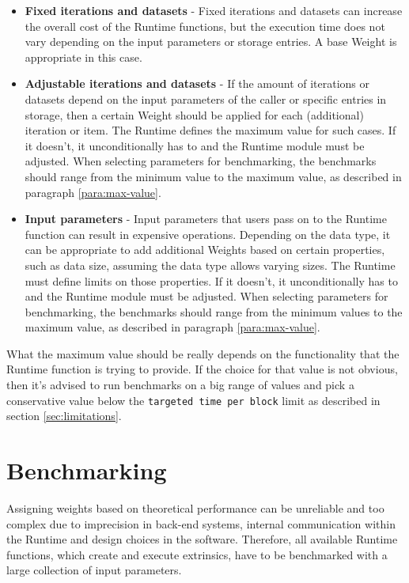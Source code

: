 \documentclass[11pt,a4paper]{article}
\begin{document}
\begin{itemize}
  \item \textbf{Fixed iterations and datasets} -
  Fixed iterations and datasets can increase the overall cost of the Runtime functions,
  but the execution time
  does not vary depending on the input parameters or storage entries.
  A base Weight is appropriate in this case.
  \item \textbf{Adjustable iterations and datasets} -
  If the amount of iterations or datasets depend on the input parameters of the caller or
  specific entries in storage,
  then a certain Weight should be applied for each (additional) iteration or item.
  The Runtime defines the maximum value for such cases. If it doesn't, it unconditionally has to
  and the Runtime module must be adjusted.
  \newline\newline
  When selecting parameters
  for benchmarking, the benchmarks should range from the minimum value to the maximum value, as described
  in paragraph \ref{para:max-value}.
  \item \textbf{Input parameters} -
  Input parameters that users pass on to the Runtime function can result in expensive operations.
  Depending on the data type, it can be appropriate to add additional Weights based on certain properties,
  such as data size, assuming the data type allows varying sizes.
  The Runtime must define limits on those properties. If it doesn't, it unconditionally
  has to and the Runtime module must be adjusted.
  \newline\newline
  When selecting parameters for benchmarking, the benchmarks should range from the minimum values to the
  maximum value, as described in paragraph \ref{para:max-value}.
\end{itemize}

\label{para:max-value} What the maximum value should be really depends on the functionality that the Runtime function
is trying to provide. If the choice for that value is not obvious, then it's advised to run
benchmarks on a big range of values and pick a conservative value below the \verb|targeted time per block|
limit as described in section \ref{sec:limitations}.

\section{Benchmarking}\label{sect:benchmarking}
Assigning weights based on theoretical performance can be
unreliable and too complex due to imprecision in back-end systems, internal communication
within the Runtime and design choices in the software. Therefore, all available Runtime 
functions, which create and execute extrinsics, have to be benchmarked with a large
collection of input parameters.
\newline
\end{document}
